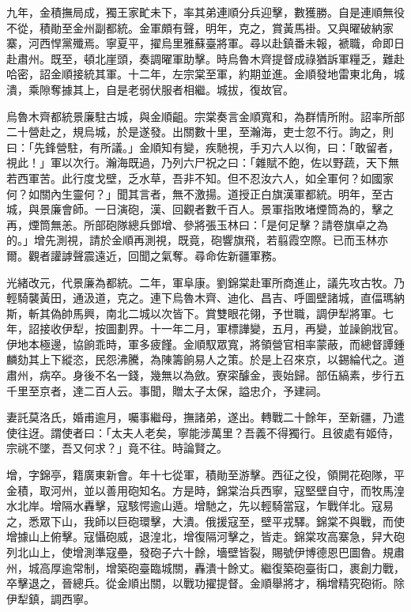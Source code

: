 \begin{pinyinscope}
九年，金積撫局成，獨王家甿未下，率其弟連順分兵迎擊，數獲勝。自是連順無役不從，積勛至金州副都統。金軍頗有聲，明年，克之，賞黃馬褂。又與曜破納家寨，河西悍黨殲焉。寧夏平，擢烏里雅蘇臺將軍。尋以赴鎮番未報，褫職，命即日赴肅州。既至，頓北崖頭，奏調曜軍助擊。時烏魯木齊提督成祿猶訴軍糧乏，難赴哈密，詔金順接統其軍。十二年，左宗棠至軍，約期並進。金順發地雷東北角，城潰，乘隙奪據其上，自是老弱伏服者相繼。城拔，復故官。

烏魯木齊都統景廉駐古城，與金順齟。宗棠奏言金順寬和，為群情所附。詔率所部二十營赴之，規烏城，於是遂發。出關數十里，至瀚海，吏士忽不行。詢之，則曰：「先鋒營駐，有所議。」金順知有變，疾馳視，手刃六人以徇，曰：「敢留者，視此！」軍以次行。瀚海既過，乃列六尸祝之曰：「雜賦不飽，佐以野蔬，天下無若西軍苦。此行度戈壁，乏水草，吾非不知。但不忍汝六人，如全軍何？如國家何？如關內生靈何？」聞其言者，無不激揚。道授正白旗漢軍都統。明年，至古城，與景廉會師。一日演砲，漢、回觀者數千百人。景軍指敗堵煙筒為的，擊之再，煙筒無恙。所部砲隊總兵鄧增、參將張玉林曰：「是何足擊？請卷旗卓之為的。」增先測視，請於金順再測視，既竟，砲響旗飛，若翦霞空際。已而玉林亦爾。觀者讙謼聲震遠近，回聞之氣奪。尋命佐新疆軍務。

光緒改元，代景廉為都統。二年，軍阜康。劉錦棠赴軍所商進止，議先攻古牧。乃輕騎襲黃田，通汲道，克之。連下烏魯木齊、迪化、昌吉、呼圖壁諸城，直偪瑪納斯，斬其偽帥馬興，南北二城以次皆下。賞雙眼花翎，予世職，調伊犁將軍。七年，詔接收伊犁，按圖劃界。十一年二月，軍標譁變，五月，再變，並譟餉戕官。伊地本極邊，協餉乖時，軍多疲饉。金順馭眾寬，將領營官相率蒙蔽，而總督譚鍾麟劾其上下縱恣，民怨沸騰，為陳籌餉易人之策。於是上召來京，以錫綸代之。道肅州，病卒。身後不名一錢，幾無以為斂。寮寀醵金，喪始歸。部伍縞素，步行五千里至京者，達二百人云。事聞，贈太子太保，謚忠介，予建祠。

妻託莫洛氏，婚甫逾月，囑事繼母，撫諸弟，遂出。轉戰二十餘年，至新疆，乃遣使往迓。謂使者曰：「太夫人老矣，寧能涉萬里？吾義不得獨行。且彼處有姬侍，宗祧不墜，吾又何求？」竟不往。時論賢之。

增，字錦亭，籍廣東新會。年十七從軍，積勛至游擊。西征之役，領開花砲隊，平金積，取河州，並以善用砲知名。方是時，錦棠治兵西寧，寇堅壁自守，而牧馬湟水北岸。增隔水轟擊，寇駭愕逾山遁。增馳之，先以輕騎當寇，乍戰佯北。寇易之，悉眾下山，我師以巨砲環擊，大潰。俄援寇至，壁平戎驛。錦棠不與戰，而使增據山上俯擊。寇懾砲威，退湟北，增復隔河擊之，皆走。錦棠攻高寨急，舁大砲列北山上，使增測準寇壘，發砲子六十餘，墻壁皆裂，賜號伊博德恩巴圖魯。規肅州，城高厚逾常制，增築砲臺臨城關，轟潰十餘丈。繼復築砲臺街口，裹創力戰，卒擊退之，晉總兵。從金順出關，以戰功擢提督。金順舉將才，稱增精究砲術。除伊犁鎮，調西寧。


\end{pinyinscope}
